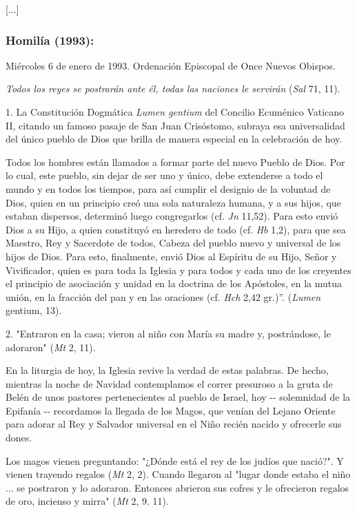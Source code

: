 \begin{body}
{[}...{]}

\subsubsection{Homilía (1993): } Miércoles 6 de enero de 1993. Ordenación Episcopal de Once Nuevos Obispos.

\emph{Todos los reyes se postrarán ante él, todas las naciones le servirán} (\emph{Sal} 71, 11).

1. La Constitución Dogmática \emph{Lumen gentium} del Concilio Ecuménico Vaticano II, citando un famoso pasaje de San Juan Crisóstomo, subraya esa universalidad del único pueblo de Dios que brilla de manera especial en la celebración de hoy.

Todos los hombres están llamados a formar parte del nuevo Pueblo de Dios. Por lo cual, este pueblo, sin dejar de ser uno y único, debe extenderse a todo el mundo y en todos los tiempos, para así cumplir el designio de la voluntad de Dios, quien en un principio creó una sola naturaleza humana, y a sus hijos, que estaban dispersos, determinó luego congregarlos (cf. \emph{Jn} 11,52). Para esto envió Dios a su Hijo, a quien constituyó en heredero de todo (cf. \emph{Hb} 1,2), para que sea Maestro, Rey y Sacerdote de todos, Cabeza del pueblo nuevo y universal de los hijos de Dios. Para esto, finalmente, envió Dios al Espíritu de su Hijo, Señor y Vivificador, quien es para toda la Iglesia y para todos y cada uno de los creyentes el principio de asociación y unidad en la doctrina de los Apóstoles, en la mutua unión, en la fracción del pan y en las oraciones (cf. \emph{Hch} 2,42 gr.)''. (\emph{Lumen} gentium, 13).

2. "Entraron en la casa; vieron al niño con María su madre y, postrándose, le adoraron" (\emph{Mt} 2, 11).

En la liturgia de hoy, la Iglesia revive la verdad de estas palabras. De hecho, mientras la noche de Navidad contemplamos el correr presuroso a la gruta de Belén de unos pastores pertenecientes al pueblo de Israel, hoy -\/- solemnidad de la Epifanía -\/- recordamos la llegada de los Magos, que venían del Lejano Oriente para adorar al Rey y Salvador universal en el Niño recién nacido y ofrecerle sus dones.

Los magos vienen preguntando: "¿Dónde está el rey de los judíos que nació?". Y vienen trayendo regalos (\emph{Mt} 2, 2). Cuando llegaron al "lugar donde estaba el niño ... se postraron y lo adoraron. Entonces abrieron sus cofres y le ofrecieron regalos de oro, incienso y mirra" (\emph{Mt} 2, 9. 11).


\end{body}
